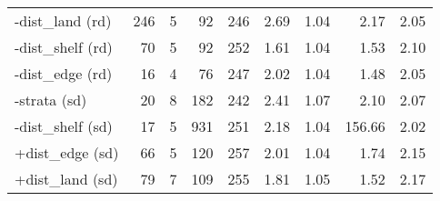 \documentclass{svjour3}
\begin{document}
\begin{table}[htbp]
\begin{tabular}{lrrrrrrrr}
  -dist\_land (rd) & 246 & 5 & 92 & 246 & 2.69 & 1.04 & 2.17 & 2.05 \\
  -dist\_shelf (rd) & 70 & 5 & 92 & 252 & 1.61 & 1.04 & 1.53 & 2.10 \\
  -dist\_edge (rd) & 16 & 4 & 76 & 247 & 2.02 & 1.04 & 1.48 & 2.05 \\
  -strata (sd) & 20 & 8 & 182 & 242 & 2.41 & 1.07 & 2.10 & 2.07 \\
  -dist\_shelf (sd) & 17 & 5 & 931 & 251 & 2.18 & 1.04 & 156.66 & 2.02 \\
  +dist\_edge (sd) & 66 & 5 & 120 & 257 & 2.01 & 1.04 & 1.74 & 2.15 \\
  +dist\_land (sd) & 79 & 7 & 109 & 255 & 1.81 & 1.05 & 1.52 & 2.17 \\
   \hline
\end{tabular}
\label{tab:extrap2012wBS}
\end{table}
\end{document}
